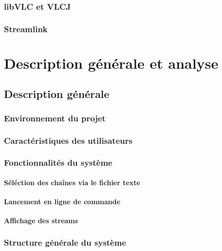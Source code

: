 \documentclass{polytech/polytech}
\begin{document}
\section{libVLC et VLCJ}


\section{Streamlink}


\part{Description générale et analyse}


\chapter{Description générale}


\section{Environnement du projet}

\section{Caractéristiques des utilisateurs}


\section{Fonctionnalités du système}


\subsection{Séléction des chaînes via le fichier texte}

\subsection{Lancement en ligne de commande}

\subsection{Affichage des streams}

\section{Structure générale du système}
\end{document}
